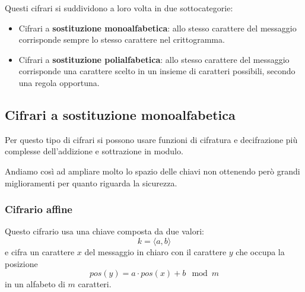 Questi cifrari si suddividono a loro volta in due sottocategorie:
\begin{itemize}
	\item Cifrari a \textbf{sostituzione monoalfabetica}: allo stesso carattere del messaggio corrisponde sempre lo
	      stesso carattere nel crittogramma.
	\item Cifrari a \textbf{sostituzione polialfabetica}: allo stesso carattere del messaggio corrisponde una carattere
	      scelto in un insieme di caratteri possibili, secondo una regola opportuna.
\end{itemize}

\subsection{Cifrari a sostituzione monoalfabetica}
Per questo tipo di cifrari si possono usare funzioni di cifratura e decifrazione pi\`u complesse dell'addizione e
sottrazione in modulo.

Andiamo cos\`i ad ampliare molto lo spazio delle chiavi non ottenendo per\`o grandi  miglioramenti per quanto
riguarda la sicurezza.

\subsubsection{Cifrario affine}
Questo cifrario usa una chiave composta da due valori:
\[ k = \langle a, b \rangle \]
e cifra un carattere $x$ del messaggio in chiaro con il carattere $y$ che occupa la posizione
\[ pos(y) = a \cdot pos(x) + b \mod{m} \]
in un alfabeto di $m$ caratteri.

